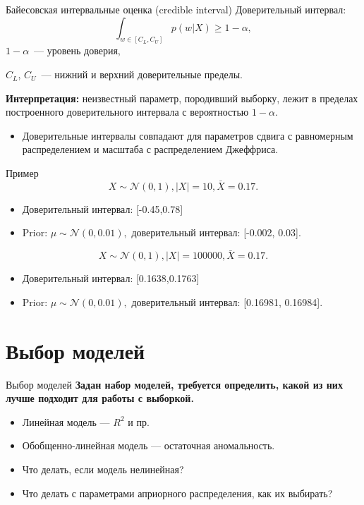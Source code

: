 \documentclass[9pt,pdf,utf8,hyperref={unicode},aspectratio=169]{beamer}
\renewcommand{\geq}{\geqslant}
\begin{document}
\begin{frame}{Байесовская интервальные оценка (credible interval)}
% 
    Доверительный интервал:
    $$\int_{w \in [C_L, C_U]}p(w|X) \geq 1-\alpha,$$
    $1-\alpha$~--- уровень доверия, 
    
    $C_L$, $C_U$~--- нижний и верхний доверительные пределы.

    \bigskip

	\textbf{Интерпретация:}  неизвестный параметр, породивший выборку, лежит в пределах построенного доверительного интервала с вероятностью $1-\alpha$.
	
\begin{itemize}
	\item Доверительные интервалы совпадают для параметров сдвига с равномерным распределением и масштаба с распределением Джеффриса.
\end{itemize}
\end{frame}

\begin{frame}{Пример}
\[
	X \sim \mathcal{N}(0,1), |X| = 10, \bar{X} = 0.17.
\]
\begin{itemize}
\item Доверительный интервал: [-0.45,0.78]
\item Prior: $\mu \sim \mathcal{N}(0, 0.01),$ доверительный интервал: [-0.002, 0.03].
\end{itemize}

\[
	X \sim \mathcal{N}(0,1), |X| = 100000, \bar{X} = 0.17.
\]
\begin{itemize}
\item Доверительный интервал: [0.1638,0.1763]
\item Prior: $\mu \sim \mathcal{N}(0, 0.01),$ доверительный интервал: [0.16981, 0.16984].
\end{itemize}



\end{frame}



\section{Выбор моделей}
\begin{frame}{Выбор моделей}
\textbf{Задан набор моделей, требуется определить, какой из них лучше подходит для работы с выборкой.}\\
\begin{itemize}
\item Линейная модель --- $R^2$ и пр.
\item Обобщенно-линейная модель --- остаточная аномальность.
\item Что делать, если модель нелинейная?
\item Что делать с параметрами априорного распределения, как их выбирать?
\end{itemize}

\end{frame}
\end{document}
